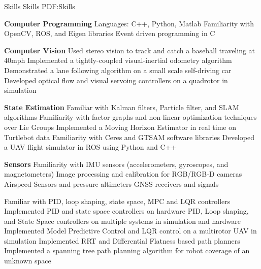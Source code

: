 \documentclass[letterpaper,MMMyyyy,nonstopmode]{simpleresumecv}
\begin{document}
\begin{Body}


\Section
{Skills}
{Skills}
{PDF:Skills}

\Entry
{\textbf{Computer Programming}}
\Gap
\BulletItem
Languages: C++, Python, Matlab
\BulletItem
Familiarity with OpenCV, ROS, and Eigen libraries
\BulletItem
Event driven programming in C %


\Gap
\Entry
{\textbf{Computer Vision}}
\Gap
\BulletItem
Used stereo vision to track and catch a baseball traveling at  40mph
\BulletItem
Implemented a tightly-coupled visual-inertial odometry algorithm
\BulletItem
Demonstrated a lane following algorithm on a small scale self-driving car
\BulletItem
Developed optical flow and visual servoing controllers on a quadrotor in simulation

\Gap
\Entry
{\textbf{State Estimation}}
\Gap
\BulletItem
Familiar with Kalman filters, Particle filter, and SLAM algorithms
\BulletItem
Familiarity with factor graphs and non-linear optimization techniques over Lie Groups
\BulletItem
Implemented a Moving Horizon Estimator in real time on Turtlebot data
\BulletItem
Familiarity with Ceres and GTSAM software libraries
\BulletItem
Developed a UAV flight simulator in ROS using Python and C++

\Gap
\Entry
{\textbf{Sensors}}
\Gap
\BulletItem
Familiarity with IMU sensors (accelerometers, gyroscopes, and magnetometers)
\BulletItem
Image processing and calibration for RGB/RGB-D cameras
\BulletItem
Airspeed Sensors and pressure altimeters
\BulletItem
GNSS receivers and signals

\Gap
{}
\Gap
\BulletItem
Familiar with PID, loop shaping, state space, MPC and LQR controllers
\BulletItem
Implemented PID and state space controllers on hardware
\BulletItem
    PID, Loop shaping, and State Space controllers on multiple systems in simulation and hardware
\BulletItem
    Implemented Model Predictive Control and LQR control on a multirotor UAV in simulation
\BulletItem
    Implemented RRT and Differential Flatness based path planners
\BulletItem
    Implemented a spanning tree path planning algorithm for robot coverage of an unknown space


\end{Body}
\end{document}
